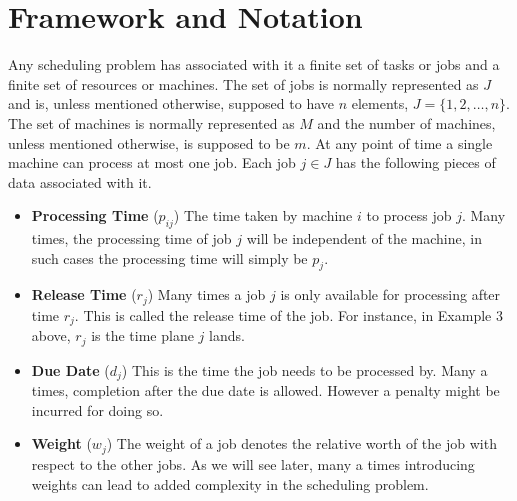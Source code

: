 \documentclass[11pt]{article}
\begin{document}
\section{Framework and Notation}
Any scheduling problem has associated with it a finite set of tasks or jobs and a finite set of resources or machines.
The set of jobs is normally represented as $J$ and is,
unless mentioned otherwise, supposed to have $n$ elements, $J = \{1,2,\ldots,n\}$.  
The set of machines is normally represented as $M$ and the number of machines, unless mentioned otherwise, is supposed to be $m$. At any point of time a single machine can process at most one job.
Each job $j\in J$ has the following pieces of data associated with it.
\begin{itemize}
\item[] {\bf Processing Time} ($p_{ij}$) The time taken by machine $i$ to process job $j$. Many times, the processing time
of job $j$ will be independent of the machine, in such cases the processing time will simply be $p_j$.

\item[] {\bf Release Time} ($r_j$) Many times a job $j$ is only available for processing after time $r_j$. This is called the release time of the job. For instance, in Example 3 above, $r_j$ is the time plane $j$ lands.

\item[]{\bf Due Date} ($d_j$) This is the time the job needs to be processed by. Many a times, completion after the due date is allowed. However a penalty might be incurred for doing so.

\item[]{\bf Weight} ($w_j$) The weight of a job denotes the relative worth of the job with respect to the other jobs. As we will see later, many a times introducing weights can lead to added complexity in the scheduling problem.
\end{itemize}
\end{document}
